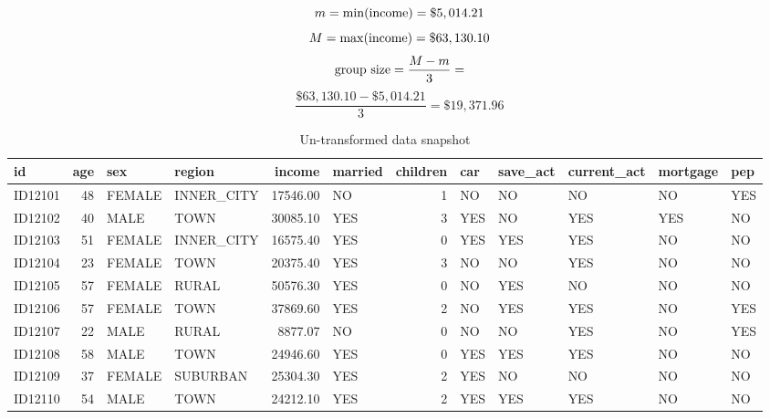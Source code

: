 \documentclass{article}
\begin{document}
\newcommand{\STAB}[1]{\begin{tabular}{@{}c@{}}#1\end{tabular}}

$$m= \min(\textnormal{income}) = \$5,014.21$$
$$M = \max(\textnormal{income}) = \$63,130.10$$
$$\textnormal{group size} = \frac{M-m}{3} = $$
$$\frac{\$63,130.10-\$5,014.21}{3}=\$19,371.96$$

\begin{table}
\centering
\begin{adjustbox}{width=\textwidth}
	\small
\begin{tabular}{|l|r|l|l|r|l|r|l|l|l|l|l|}
	\hline
	id & age & sex & region & income & married & children & car & save\_act & current\_act & mortgage & pep\\
	\hline
	ID12101 & 48 & FEMALE & INNER\_CITY & 17546.00 & NO & 1 & NO & NO & NO & NO & YES\\
	
	ID12102 & 40 & MALE & TOWN & 30085.10 & YES & 3 & YES & NO & YES & YES & NO\\
	
	ID12103 & 51 & FEMALE & INNER\_CITY & 16575.40 & YES & 0 & YES & YES & YES & NO & NO\\
	
	ID12104 & 23 & FEMALE & TOWN & 20375.40 & YES & 3 & NO & NO & YES & NO & NO\\
	
	ID12105 & 57 & FEMALE & RURAL & 50576.30 & YES & 0 & NO & YES & NO & NO & NO\\
	
	ID12106 & 57 & FEMALE & TOWN & 37869.60 & YES & 2 & NO & YES & YES & NO & YES\\
	
	ID12107 & 22 & MALE & RURAL & 8877.07 & NO & 0 & NO & NO & YES & NO & YES\\
	
	ID12108 & 58 & MALE & TOWN & 24946.60 & YES & 0 & YES & YES & YES & NO & NO\\
	
	ID12109 & 37 & FEMALE & SUBURBAN & 25304.30 & YES & 2 & YES & NO & NO & NO & NO\\
	
	ID12110 & 54 & MALE & TOWN & 24212.10 & YES & 2 & YES & YES & YES & NO & NO\\
	\hline
\end{tabular}
\end{adjustbox}
\caption{Un-transformed data snapshot}
\end{table}
\end{document}
